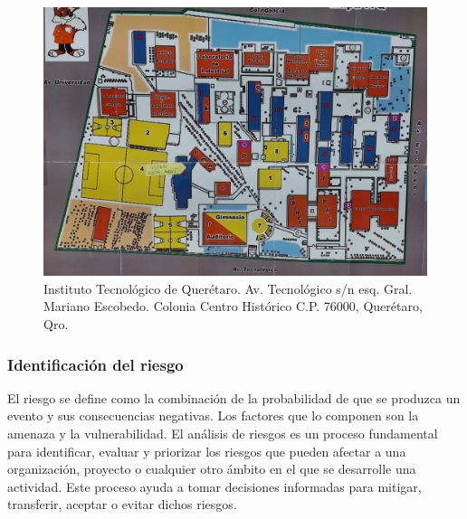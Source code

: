 \begin{figure}[H]
        \centering
        \includegraphics[trim = {0mm 0mm 0mm 0mm},clip,scale=0.2]{10/Img/mapa.jpg}
        \caption{Instituto Tecnológico de Querétaro. Av. Tecnológico s/n esq. Gral. Mariano Escobedo. Colonia Centro Histórico C.P. 76000, Querétaro, Qro.}
        \label{Mapa}
    \end{figure}
%
%
\subsubsection{Identificación del riesgo}

El riesgo se define como la combinación de la probabilidad de que se produzca un evento y sus consecuencias negativas. Los factores que lo componen son la amenaza y la vulnerabilidad.\cite{Riesgo}
\newline
El análisis de riesgos es un proceso fundamental para identificar, evaluar y priorizar los riesgos que pueden afectar a una organización, proyecto o cualquier otro ámbito en el que se desarrolle una actividad. Este proceso ayuda a tomar decisiones informadas para mitigar, transferir, aceptar o evitar dichos riesgos.

